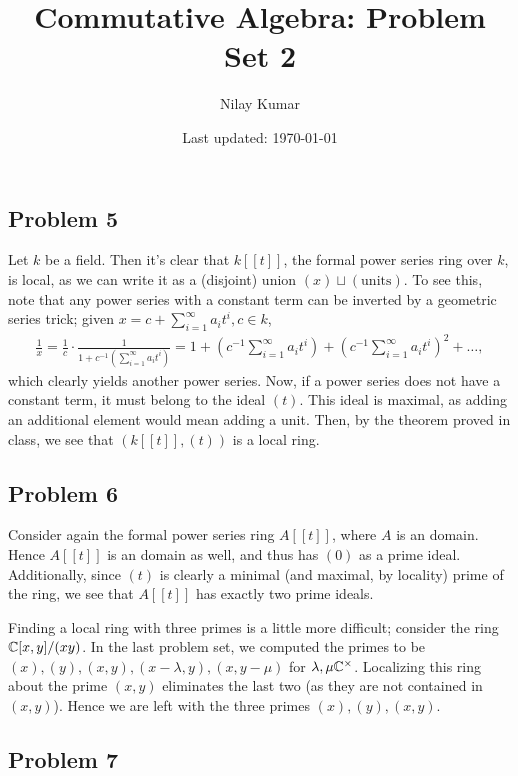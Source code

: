 \documentclass{../../mathnotes}
\title{Commutative Algebra: Problem Set 2}
\author{Nilay Kumar}
\date{Last updated: \today}
\begin{document}
\maketitle

\subsection*{Problem 5}

Let $k$ be a field. Then it's clear that $k[ [ t] ]$, the formal power series ring over $k$, is local, as we can write it as
a (disjoint) union $(x)\sqcup (\text{units})$. To see this, note that any power series with a constant term can be inverted
by a geometric series trick; given $x=c+\sum^\infty_{i=1} a_it^i, c\in k$,
\begin{align*}
    \frac{1}{x}=\frac{1}{c}\cdot\frac{1}{1+c^{-1}(\sum^\infty_{i=1} a_it^i)}=1+\left(c^{-1}\sum^\infty_{i=1} a_it^i\right)+\left(c^{-1}\sum^\infty_{i=1} a_it^i\right)^2+\ldots,
\end{align*}
which clearly yields another power series. Now, if a power series does not have a constant term, it must belong to the ideal $(t)$. This ideal is
maximal, as adding an additional element would mean adding a unit. Then, by the theorem proved in class, we see that $(k[ [t] ],(t))$ is a local ring.

\subsection*{Problem 6}

Consider again the formal power series ring $A[ [t] ]$, where $A$ is an domain. Hence $A[ [t] ]$ is an domain as well, and thus has
$(0)$ as a prime ideal. Additionally, since $(t)$ is clearly a minimal (and maximal, by locality) prime of the ring, we see that $A[ [t]]$ has
exactly two prime ideals.

Finding a local ring with three primes is a little more difficult; consider the ring $\mathbb{C}[x,y]/(xy)$. In the last problem set, we computed the primes
to be $(x),(y),(x,y),(x-\lambda, y), (x,y-\mu)$ for $\lambda,\mu \mathbb{C}^\times$. Localizing this ring about the prime $(x,y)$ eliminates the last two
(as they are not contained in $(x,y)$). Hence we are left with the three primes $(x),(y),(x,y)$.

\subsection*{Problem 7}
\end{document}
